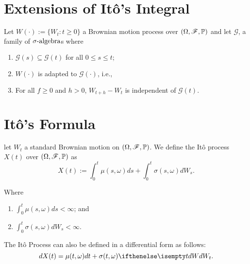 \documentclass[../TGMAFFIRO.tex]{subfiles}
\begin{document}
\section{Extensions of It\^o's Integral}
\begin{definition}
	Let $W(\cdot) := \{W_t : t\geq 0\}$ a Brownian motion process over $(\Omega, \mathscr{F}, \mathbb{P})$ and let $\mathscr{G}$, a family of $\sigma\text{-algebra}$s where
	\begin{enumerate}
		\item $\mathscr{G}(s) \subseteq \mathscr{G}(t)$ for all $0\leq s \leq t$;
		\item $W(\cdot)$ is adapted to $\mathscr{G}(\cdot)$, i.e.,
		\item For all $f\geq 0$ and $h > 0$, $W_{t+h} - W_t$ is independent of $\mathscr{G}(t)$.
	\end{enumerate}
\end{definition}

\section{It\^o's Formula}

\begin{definition}\label{def:ito_process}
	let $W_t$ a standard Brownian motion on $(\Omega, \mathscr{F}, \mathbb{P})$. We define the It\^o process $X(t)$ over $(\Omega, \mathscr{F}, \mathbb{P})$ as
	\begin{equation}
		X(t) := \int_0^t\mu(s,\omega) ds  + \int_0^t\sigma(s,\omega) dW_s.
	\end{equation}
	
	Where
	\begin{enumerate}
		\item $\int_0^t \mu(s,\omega) ds < \infty$; and
		\item $\int_0^t\sigma(s,\omega) dW_s < \infty$.
	\end{enumerate}
	
	The It\^o Process can also be defined in a differential form as follows:
	\begin{equation}
		dX(t) = \mu(t, \omega) dt + \sigma(t, \omega) \dW[t].
	\end{equation}
\end{definition}
\end{document}

